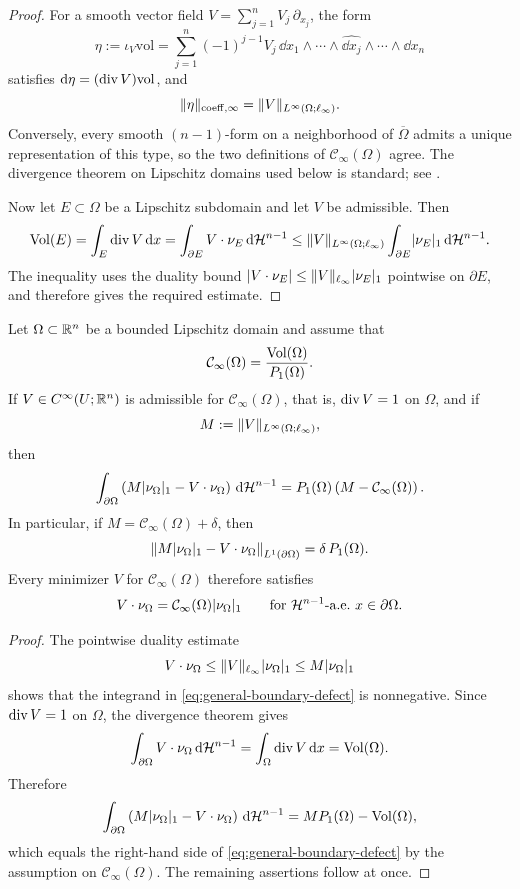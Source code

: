 \begin{proof}
For a smooth vector field $V=\sum_{j=1}^n V_j\,\partial_{x_j}$, the form
\[
\eta:=\iota_V\mathrm{vol}
=
\sum_{j=1}^n (-1)^{j-1}V_j\,
\dd x_1\wedge\cdots\wedge\widehat{\dd x_j}\wedge\cdots\wedge \dd x_n
\]
satisfies
$\mathrm{d}\eta=(\operatorname{div} V)\mathrm{vol}$, and
\[
\lVert \eta \rVert_{\mathrm{coeff},\infty}=
\lVert V \rVert_{L^\infty(\Omega;\ell_\infty)}.
\]
Conversely, every smooth $(n-1)$-form on a neighborhood of $\overline{\Omega}$
admits a unique representation of this type, so the two definitions of
$\mathcal C_\infty(\Omega)$ agree. The divergence theorem on Lipschitz domains
used below is standard; see \cite{Federer1969,EvansGariepy2015,Maggi2012}.

Now let $E\subset\Omega$ be a Lipschitz subdomain and let $V$ be admissible.
Then
\[
\operatorname{Vol}(E)
=
\int_E \operatorname{div} V\,\mathrm{d} x
=
\int_{\partial E}V\cdot \nu_E\,\mathrm{d}\mathcal{H}^{n-1}
\le
\lVert V \rVert_{L^\infty(\Omega;\ell_\infty)}
\int_{\partial E}\lvert \nu_E \rvert_1\,\mathrm{d}\mathcal{H}^{n-1}.
\]
The inequality uses the duality bound
$\lvert V\cdot \nu_E \rvert\le \lVert V \rVert_{\ell_\infty}\lvert \nu_E \rvert_1$ pointwise on
$\partial E$, and therefore gives the required estimate.
\end{proof}

\begin{proposition}
\label{prop:quantitative-boundary-saturation}
Let $\Omega\subset\mathbb{R}^n$ be a bounded Lipschitz domain and assume that
\[
\mathcal C_\infty(\Omega)=\frac{\operatorname{Vol}(\Omega)}{P_1(\Omega)}.
\]
If $V\in C^\infty(U;\mathbb{R}^n)$ is admissible for $\mathcal C_\infty(\Omega)$,
that is, $\operatorname{div} V=1$ on $\Omega$, and if
\[
M:=\lVert V \rVert_{L^\infty(\Omega;\ell_\infty)},
\]
then
\begin{equation}
\label{eq:general-boundary-defect}
\int_{\partial\Omega}
\left(
M\lvert \nu_\Omega \rvert_1-V\cdot \nu_\Omega
\right)\,\mathrm{d}\mathcal{H}^{n-1}
=
P_1(\Omega)\left(M-\mathcal C_\infty(\Omega)\right).
\end{equation}
In particular, if $M=\mathcal C_\infty(\Omega)+\delta$, then
\[
\left\|
M\lvert \nu_\Omega \rvert_1-V\cdot \nu_\Omega
\right\|_{L^1(\partial\Omega)}
=
\delta\,P_1(\Omega).
\]
Every minimizer $V$ for $\mathcal C_\infty(\Omega)$ therefore satisfies
\[
V\cdot \nu_\Omega
=
\mathcal C_\infty(\Omega)\lvert \nu_\Omega \rvert_1
\qquad
\text{for $\mathcal{H}^{n-1}$-a.e.\ }x\in\partial\Omega.
\]
\end{proposition}

\begin{proof}
The pointwise duality estimate
\[
V\cdot \nu_\Omega\le \lVert V \rVert_{\ell_\infty}\lvert \nu_\Omega \rvert_1\le
M\lvert \nu_\Omega \rvert_1
\]
shows that the integrand in \eqref{eq:general-boundary-defect} is
nonnegative. Since $\operatorname{div} V=1$ on $\Omega$, the divergence theorem gives
\[
\int_{\partial\Omega}V\cdot \nu_\Omega\,\mathrm{d}\mathcal{H}^{n-1}
=
\int_\Omega \operatorname{div} V\,\mathrm{d} x
=
\operatorname{Vol}(\Omega).
\]
Therefore
\[
\int_{\partial\Omega}
\left(
M\lvert \nu_\Omega \rvert_1-V\cdot \nu_\Omega
\right)\,\mathrm{d}\mathcal{H}^{n-1}
=
M P_1(\Omega)-\operatorname{Vol}(\Omega),
\]
which equals the right-hand side of \eqref{eq:general-boundary-defect} by the
assumption on $\mathcal C_\infty(\Omega)$. The remaining assertions follow at
once.
\end{proof}

